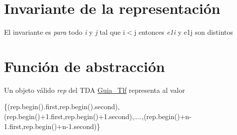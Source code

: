 \hypertarget{repGuia_Tlf_invGuia_Tlf}{}\section{Invariante de la representación}\label{repGuia_Tlf_invGuia_Tlf}
El invariante es {\itshape para} todo {\itshape i} y {\itshape j} tal que i$<$j entonces {\itshape e1i} y e1j son distintos\hypertarget{repGuia_Tlf_faGuia_Tlf}{}\section{Función de abstracción}\label{repGuia_Tlf_faGuia_Tlf}
Un objeto válido {\itshape rep} del T\+DA \hyperlink{classGuia__Tlf}{Guia\+\_\+\+Tlf} representa al valor

\{(rep.\+begin().first,rep.\+begin().second),(rep.\+begin()+1.first,rep.\+begin()+1.second),....,(rep.\+begin()+n-\/1.first,rep.\+begin()+n-\/1.second)\} 